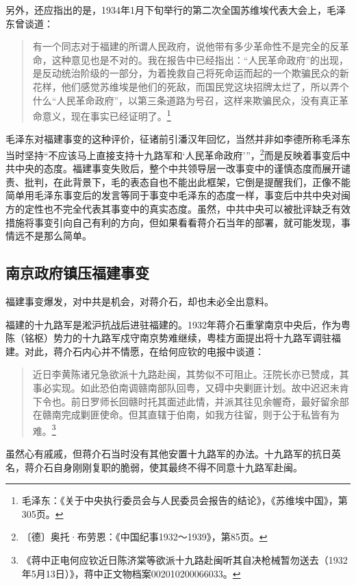 另外，还应指出的是，1934年1月下旬举行的第二次全国苏维埃代表大会上，毛泽东曾谈道：

\begin{quote}

有一个同志对于福建的所谓人民政府，说他带有多少革命性不是完全的反革命，这种意见也是不对的。我在报告中已经指出：“人民革命政府”的出现，是反动统治阶级的一部分，为着挽救自己将死命运而起的一个欺骗民众的新花样，他们感觉苏维埃是他们的死敌，而国民党这块招牌太烂了，所以弄个什么“人民革命政府”，以第三条道路为号召，这样来欺骗民众，没有真正革命意义，现在事实已经证明了。\footnote{毛泽东：《关于中央执行委员会与人民委员会报告的结论》，《苏维埃中国》，第305页。}
\end{quote}


毛泽东对福建事变的这种评价，征诸前引潘汉年回忆，当然并非如李德所称毛泽东当时坚持“不应该马上直接支持十九路军和‘人民革命政府’”，\footnote{〔德〕奥托·布劳恩：《中国纪事1932～1939》，第85页。}而是反映着事变后中共中央的态度。福建事变失败后，整个中共领导层一改事变中的谨慎态度而展开谴责、批判，在此背景下，毛的表态自也不能出此框架，它倒是提醒我们，正像不能简单用毛泽东事变后的发言等同于事变中毛泽东的态度一样，事变后中共中央对闽方的定性也不完全代表其事变中的真实态度。虽然，中共中央可以被批评缺乏有效措施将事变引向自己有利的方向，但如果看看蒋介石当年的部署，就可能发现，事情远不是那么简单。

\subsection{南京政府镇压福建事变}


福建事变爆发，对中共是机会，对蒋介石，却也未必全出意料。


福建的十九路军是淞沪抗战后进驻福建的。1932年蒋介石重掌南京中央后，作为粤陈（铭枢）势力的十九路军戍守南京势难继续，粤桂方面提出将十九路军调驻福建。对此，蒋介石内心并不情愿，在给何应钦的电报中谈道：

\begin{quote}

近日李黄陈诸兄急欲派十九路赴闽，其势似不可阻止。汪院长亦已赞成，其事必实现。如此恐伯南调赣南部队回粤，又碍中央剿匪计划。故中迟迟未肯下令也。前日罗师长回赣时托其面述此情，并派其往见余幄奇，最好留余部在赣南完成剿匪使命。但其直辖于伯南，如我方往留，则于公于私皆有为难。\footnote{《蒋中正电何应钦近日陈济棠等欲派十九路赴闽听其自决枪械暂勿送去（1932年5月13日）》，蒋中正文物档案002010200066033。}
\end{quote}


虽然心有戚戚，但蒋介石当时没有其他安置十九路军的办法。十九路军的抗日英名，蒋介石自身刚刚复职的脆弱，使其最终不得不同意十九路军赴闽。


